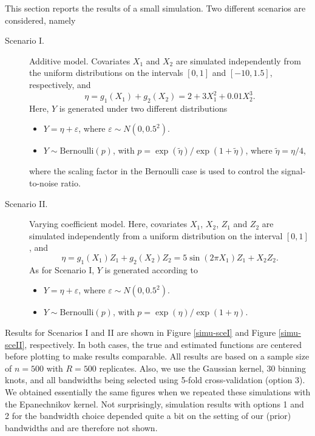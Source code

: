 This section reports the results of a small simulation. Two different scenarios are considered, namely
\begin{description}
\item[Scenario I.] Additive model. Covariates $X_{1}$ and $X_{2}$ are simulated independently from the uniform distributions on the intervals $\left[0,1\right]$ and $\left[-10,1.5\right]$, respectively, and  
\begin{equation*}
\eta  = g_1\left(X_{1}\right) + g_2\left(X_{2}\right) = 2 + 3X_{1}^2 + 0.01X_{2}^3.
\end{equation*}
Here, $Y$ is generated under two different distributions
\begin{itemize}
	\item $Y = \eta + \varepsilon$, where $\varepsilon \sim N\left(0, 0.5^2\right)$.
	\item $Y \sim \text{Bernoulli}\left(p\right)$, with $p = \exp\left(\widetilde{\eta}\right)/\exp\left(1 + \widetilde{\eta}\right)$, where $\widetilde{\eta} = \eta/4$,
\end{itemize}
	where the scaling factor in the Bernoulli case is used to control the signal-to-noise ratio.
\item[Scenario II.] Varying coefficient model. Here, covariates $X_{1}$, $X_{2}$, $Z_{1}$ and $Z_{2}$ are simulated independently from a uniform distribution on the interval $\left[0,1\right]$, and 
\begin{equation*}
\eta  = g_1\left(X_{1}\right)Z_{1} + g_2\left(X_{2}\right)Z_{2} = 5\sin(2 \pi X_{1})Z_{1}  + X_{2}Z_{2}.
\end{equation*}
As for Scenario I, $Y$ is generated according to
\begin{itemize}
	\item $Y = \eta + \varepsilon$, where $\varepsilon\sim N\left(0, 0.5^2\right)$.
	\item $Y \sim \text{Bernoulli}\left(p\right)$, with $p = \exp\left(\eta\right)/\exp\left(1 + \eta\right)$.
\end{itemize}
\end{description}
Results for Scenarios I and II are shown in Figure \ref{simu-sceI} and Figure \ref{simu-sceII}, respectively. In both cases, the true and estimated functions are centered before plotting to make results comparable. All results are based on a sample size of $n = 500$ with $R = 500$ replicates. Also, we use the Gaussian kernel, $30$ binning knots, and all bandwidths being selected using 5-fold cross-validation (option 3). We obtained essentially the same figures when we repeated these simulations with the Epanechnikov kernel. Not surprisingly, simulation results with options 1 and 2 for the bandwidth choice depended quite a bit on the setting of our (prior) bandwidths and are therefore not shown.  
 

